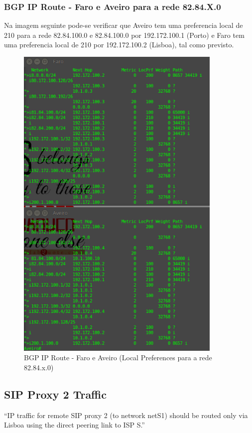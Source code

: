 \documentclass[11pt,a4paper]{report}
\begin{document}
\subsubsection{BGP IP Route - Faro e Aveiro para a rede 82.84.X.0}

Na imagem seguinte pode-se verificar que Aveiro tem uma preferencia local de 210 para a rede 82.84.100.0 e 82.84.100.0 por 192.172.100.1 (Porto) e Faro tem uma preferencia local de 210 por 192.172.100.2 (Lisboa), tal como previsto.

\begin{figure}[H]
\centerline{\includegraphics[width=280pt]{Selection_001.png}}
\caption{BGP IP Route - Faro e Aveiro (Local Preferences para a rede 82.84.x.0)}
\label{schema}
\end{figure}

\subsection{SIP Proxy 2 Traffic}

``IP traffic for remote SIP proxy 2 (to network netS1) should be routed only via Lisboa using the direct peering link to ISP S.''
\newline
\end{document}
